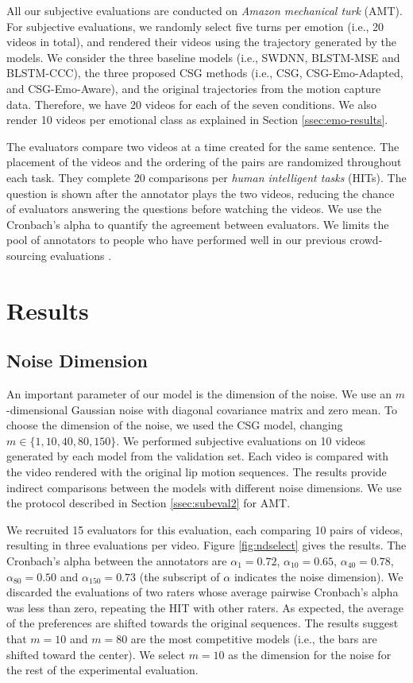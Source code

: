 \documentclass[10pt,journal,compsoc]{IEEEtran}
\begin{document}
All our subjective evaluations are conducted on \emph{Amazon mechanical turk} (AMT). For subjective evaluations, we randomly select five turns per emotion (i.e., 20 videos in total), and rendered their videos using the trajectory generated by the models. We consider the three baseline models (i.e., SWDNN, BLSTM-MSE and BLSTM-CCC), the three proposed CSG methods (i.e., CSG, CSG-Emo-Adapted, and CSG-Emo-Aware), and the original trajectories from the motion capture data. Therefore, we have 20 videos for each of the seven conditions. We also render 10 videos per emotional class as explained in Section \ref{ssec:emo-results}.

The evaluators compare two videos at a time created for the same sentence. The placement of the videos and the ordering of the pairs are randomized throughout each task. They complete 20 comparisons per \emph{human intelligent tasks} (HITs). The  question is shown after the annotator plays the two videos, reducing the chance of evaluators answering the questions before watching the videos. We use the Cronbach's alpha to quantify the agreement between evaluators. We limits the pool of annotators to people who have performed well in our previous crowd-sourcing evaluations \cite{Burmania_2016_2, Sadoughi_2017_3, Lotfian_201x}.

\section{Results}
\label{sec:results}


\subsection{Noise Dimension}
\label{ssec:noiseDimension}

An important parameter of our model is the dimension of the noise. We use an $m$-dimensional Gaussian noise with diagonal covariance matrix and zero mean. To choose the dimension of the noise, we used the CSG model, changing $m\in \{1, 10, 40, 80, 150\}$. We performed subjective evaluations on 10 videos generated by each model from the validation set. Each video is compared with the video rendered with the original lip motion sequences. The results provide indirect comparisons between the models with different noise dimensions. We use the protocol described in Section \ref{ssec:subeval2} for AMT. 

We recruited 15 evaluators for this evaluation, each comparing 10 pairs of videos, resulting in three evaluations per video. Figure \ref{fig:ndselect} gives the results. The Cronbach's alpha between the annotators are $\alpha_{1}=0.72$, $\alpha_{10}=0.65$, $\alpha_{40}=0.78$, $\alpha_{80}=0.50$ and $\alpha_{150}=0.73$ (the subscript of $\alpha$ indicates the noise dimension). We discarded the evaluations of two raters whose average pairwise Cronbach's alpha was less than zero, repeating the HIT with other raters. As expected, the average of the preferences are shifted towards the original sequences. The results suggest that $m=10$ and $m=80$ are the most competitive models (i.e., the bars are shifted toward the center). We select $m=10$ as the dimension for the noise for the rest of the experimental evaluation. 
\end{document}
